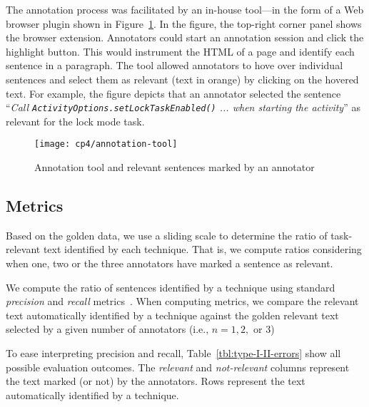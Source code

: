 The annotation process was facilitated by an in-house tool---in the form of a Web browser plugin shown in Figure~\ref{fig:corpus-annotation-tool}. In the figure, the top-right corner panel shows the browser extension. Annotators could start an annotation session and click the highlight button.
This would instrument the HTML of a page and identify each sentence in a paragraph. The tool allowed annotators to hove over individual sentences and select them as relevant (text in orange) by clicking on the hovered text. For example, the figure depicts that an annotator selected  the sentence
``\textit{Call {\small \texttt{ActivityOptions.setLockTaskEnabled()}} ... when starting the activity}'' as relevant for the lock mode task.


\begin{figure}
    \centering
    \texttt{[image: cp4/annotation-tool]}
    \caption{Annotation tool and relevant sentences marked by an annotator}
    \label{fig:corpus-annotation-tool}
\end{figure}



\subsection{Metrics}


Based on the golden data, we use a sliding scale to determine the ratio of task-relevant text identified by each technique. That is, we compute ratios considering when one, two or the three annotators have marked a sentence as relevant.


We  
compute the ratio of sentences identified by a technique using standard \textit{precision} and \textit{recall} metrics~\cite{Manning2009IR}. When computing metrics, we compare the relevant text automatically identified by a technique against the golden relevant text 
selected by a given number of annotators (i.e., $n=1, 2,$ or $3$)




To ease interpreting precision and recall, Table~\ref{tbl:type-I-II-errors} show all possible evaluation outcomes. The \textit{relevant} and \textit{not-relevant} columns represent the text 
marked (or not) by the annotators. Rows represent the text automatically identified by a technique.




 


